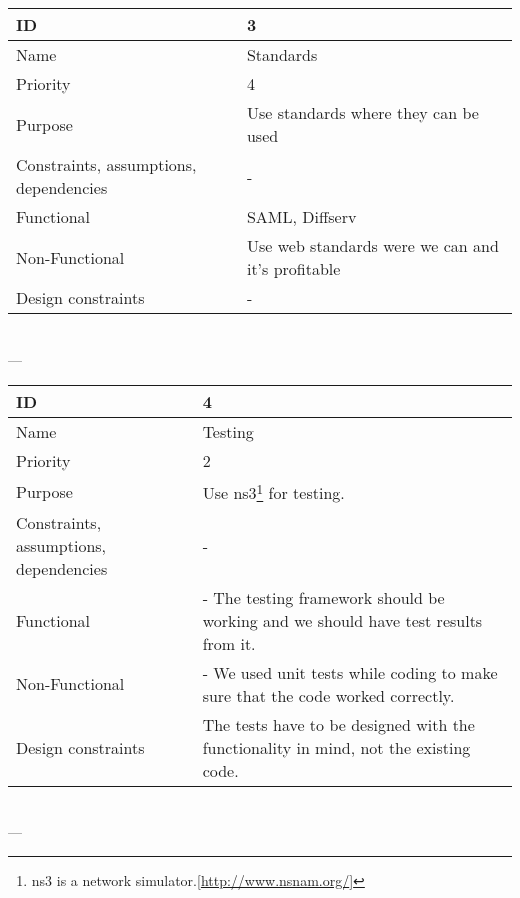 \begin{center}
    \begin{tabular}{| p{4cm} | p{8cm} |}
        \hline
        ID & 3 \\
        \hline
        Name & Standards \\
        \hline
        Priority & 4 \\
        \hline
        Purpose & Use standards where they can be used \\
        \hline 
        Constraints, assumptions, dependencies & -\\
        \hline  
        Functional & SAML, Diffserv \\
        \hline
        Non-Functional & Use web standards were we can and it's profitable \\ 
        \hline
        Design constraints & - \\
        \hline
    \end{tabular}
    \\  ---  \\
    
    \begin{tabular}{| p{4cm} | p{8cm} |}
        \hline
        ID & 4 \\
        \hline
        Name & Testing  \\
        \hline
        Priority & 2 \\
        \hline
        Purpose & Use \gls{ns3}\footnote{\gls{ns3} is a network simulator.[\url{http://www.nsnam.org/}]} for testing. \\
        \hline 
        Constraints, assumptions, dependencies & -\\
        \hline  
        Functional & - The testing framework should be working and we should have test results from it.\\
        \hline
        Non-Functional & - We used unit tests while coding to make sure that the code worked correctly. \\ 
        \hline
        Design constraints & The tests have to be designed with the functionality in mind, not the existing code. \\
        \hline
    \end{tabular}
    \\  ---  \\
    

\end{center}
